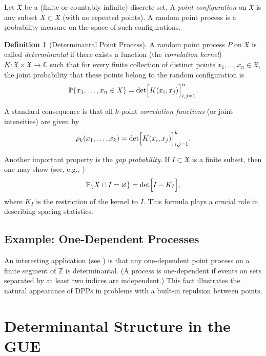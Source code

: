 \documentclass[letterpaper,11pt,oneside,reqno]{article}
\numberwithin{equation}{section}
\theoremstyle{definition}
\newtheorem{definition}[proposition]{Definition}
\begin{document}
Let $\mathfrak{X}$ be a (finite or countably infinite)
discrete set. A \emph{point configuration} on $\mathfrak{X}$
is any subset $X\subset\mathfrak{X}$ (with no repeated
points). A random point process is a probability measure on
the space of such configurations.

\begin{definition}[Determinantal Point Process]
A random point process $P$ on $\mathfrak{X}$ is called \emph{determinantal} if there exists a function (the \emph{correlation kernel}) $K:\mathfrak{X}\times\mathfrak{X}\to\mathbb{C}$ such that for every finite collection of distinct points $x_1,\dots,x_n\in \mathfrak{X}$, the joint probability that these points belong to the random configuration is
\[
\operatorname{\mathbb{P}}\{x_1,\dots,x_n\in X\}=\det\Bigl[K(x_i,x_j)\Bigr]_{i,j=1}^n.
\]
\end{definition}

A standard consequence is that all $k$-point \emph{correlation functions} (or joint intensities) are given by
\[
\rho_k(x_1,\dots,x_k)=\det\Bigl[K(x_i,x_j)\Bigr]_{i,j=1}^k.
\]

Another important property is the \emph{gap probability}. If $I\subset\mathfrak{X}$ is a finite subset, then one may show (see, e.g., \cite{Borodin2009})
\[
\operatorname{\mathbb{P}}\{X\cap I=\varnothing\}=\det\Bigl[I-K_I\Bigr],
\]
where $K_I$ is the restriction of the kernel to $I$. This formula plays a crucial role in describing spacing statistics.

\subsection{Example: One-Dependent Processes}
An interesting application (see \cite{borodin2010adding}) is that any one-dependent point process on a finite segment of $\mathbb{Z}$ is determinantal. (A process is one-dependent if events on sets separated by at least two indices are independent.) This fact illustrates the natural appearance of DPPs in problems with a built-in repulsion between points.

\section{Determinantal Structure in the GUE}
\label{sec:gue-dpp}
\end{document}
